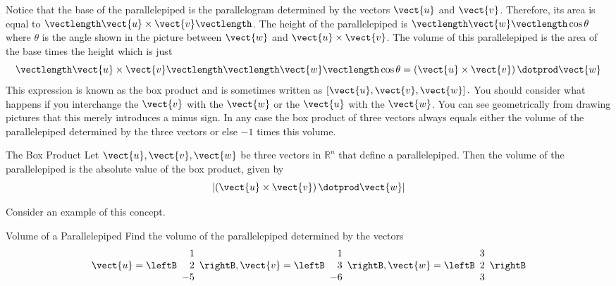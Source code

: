 Notice that the base of the parallelepiped is the parallelogram
determined by the vectors $\vect{u}$ and $\vect{v}$. Therefore, its area is equal to 
$\vectlength \vect{u}\times \vect{v} \vectlength $. The height of the parallelepiped
is $\vectlength \vect{w}\vectlength \cos \theta $ where $\theta $ is the angle
shown in the picture between $\vect{w}$ and $\vect{u}\times \vect{v}$.
The volume of this parallelepiped is the area of the base times
the height which is just
\begin{equation*}
\vectlength \vect{u}\times \vect{v}\vectlength \vectlength \vect{w}\vectlength \cos \theta =
\left( \vect{u}\times\vect{v}\right) \dotprod \vect{w}
\end{equation*}
This expression is known as the box product and is sometimes written as 
$\left[ \vect{u},\vect{v},\vect{w}\right] .$
You should consider what happens if you interchange the 
$\vect{v}$ with the $\vect{w}$ or the $\vect{u}$ with the $\vect{w}$.
You can see geometrically from drawing pictures that this merely introduces
a minus sign. In any case the box product of three vectors always equals
either the volume of the parallelepiped determined by the three vectors or
else $-1$ times this volume.

\begin{proposition}{The Box Product}\label{prop:boxproduct}
Let $\vect{u}, \vect{v}, \vect{w}$ be three vectors in $\mathbb{R}^n$ that define a parallelepiped. Then the volume of the parallelepiped is the absolute value of the box product, given by 
\[
\left| \left(\vect{u}\times\vect{v}\right) \dotprod \vect{w} \right|
\]
\end{proposition}

Consider an example of this concept.

\begin{example}{Volume of a Parallelepiped}\label{exa:parallelepipedvolume}
Find the volume of the parallelepiped determined by the vectors
\begin{equation*}
\vect{u}
=
\leftB
\begin{array}{r}
1 \\
2 \\
-5
\end{array}
\rightB, 
\vect{v}
=
\leftB
\begin{array}{r}
1 \\
3 \\
-6
\end{array}
\rightB, 
\vect{w}
=
\leftB
\begin{array}{r}
3 \\
2 \\
3
\end{array}
\rightB
\end{equation*}
\end{example}

